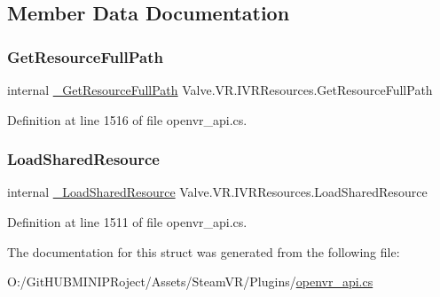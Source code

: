 \subsection{Member Data Documentation}
\mbox{\label{struct_valve_1_1_v_r_1_1_i_v_r_resources_a7446f46425cce1a9098868fa7235bb20}} 
\subsubsection{\texorpdfstring{GetResourceFullPath}{GetResourceFullPath}}
{\footnotesize\ttfamily internal \mbox{\hyperlink{struct_valve_1_1_v_r_1_1_i_v_r_resources_a288dac70d54efc2dcbfdd73e66ead2a2}{\+\_\+\+Get\+Resource\+Full\+Path}} Valve.\+V\+R.\+I\+V\+R\+Resources.\+Get\+Resource\+Full\+Path}



Definition at line 1516 of file openvr\+\_\+api.\+cs.

\mbox{\label{struct_valve_1_1_v_r_1_1_i_v_r_resources_a451c2aa63cced8dc34cadf4f20f5c071}} 
\subsubsection{\texorpdfstring{LoadSharedResource}{LoadSharedResource}}
{\footnotesize\ttfamily internal \mbox{\hyperlink{struct_valve_1_1_v_r_1_1_i_v_r_resources_a47884b57d0f09e94f051c25d7e05037e}{\+\_\+\+Load\+Shared\+Resource}} Valve.\+V\+R.\+I\+V\+R\+Resources.\+Load\+Shared\+Resource}



Definition at line 1511 of file openvr\+\_\+api.\+cs.



The documentation for this struct was generated from the following file\+:\begin{DoxyCompactItemize}
\item 
O\+:/\+Git\+H\+U\+B\+M\+I\+N\+I\+P\+Roject/\+Assets/\+Steam\+V\+R/\+Plugins/\mbox{\hyperlink{openvr__api_8cs}{openvr\+\_\+api.\+cs}}\end{DoxyCompactItemize}
